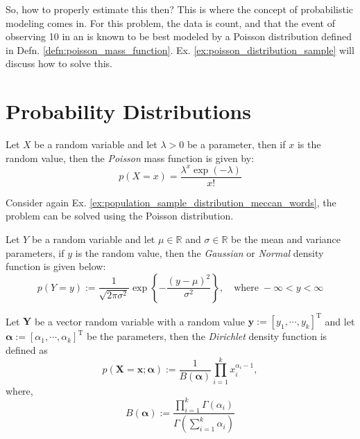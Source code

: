 \begin{exmp}
So, how to properly estimate this then? This is where the concept of probabilistic modeling comes in. For this problem, the data is count, and that the event of observing 10   in an  is known to be best modeled by a Poisson distribution defined in Defn. \ref{defn:poisson_mass_function}. Ex. \ref{ex:poisson_distribution_sample} will discuss how to solve this. 
\end{exmp}
\section{Probability Distributions}
\begin{defn}\label{defn:poisson_mass_function}
Let $X$ be a random variable and let $\lambda>0$ be a parameter, then if $x$ is the random value, then the \textit{Poisson} mass function is given by:
\begin{equation}
     p(X=x)=\frac{\lambda^x\exp(-\lambda)}{x!}
\end{equation}
\end{defn}
\begin{exmp}\label{ex:poisson_distribution_sample}
Consider again Ex. \ref{ex:population_sample_distribution_meccan_words}, the problem can be solved using the Poisson distribution.
\end{exmp}
\begin{defn}
Let $Y$ be a random variable and let $\mu\in\mathbb{R}$ and $\sigma\in\mathbb{R}$ be the mean and variance parameters, if $y$ is the random value, then the \textit{Gaussian} or \textit{Normal} density function is given below:
\begin{equation}
     p(Y=y):=\frac{1}{\sqrt{2\pi\sigma^2}}\exp\left\{-\frac{(y-\mu)^2}{\sigma^2}\right\},\quad\text{where}\;-\infty<y<\infty
\end{equation}
\end{defn}
\begin{defn}
Let $\mathbf{Y}$ be a vector random variable with a random value $\mathbf{y}:=[y_1,\cdots,y_k]^{\text{T}}$ and let $\boldsymbol{\alpha}:=[\alpha_1,\cdots,\alpha_k]^{\text{T}}$ be the parameters, then the \textit{Dirichlet} density function is defined as
\begin{equation}
     p(\mathbf{X}=\mathbf{x};\boldsymbol{\alpha}):=\frac{1}{B(\boldsymbol{\alpha})}\prod_{i=1}^kx_i^{\alpha_i-1},
\end{equation}
where,
\begin{equation}
    B(\boldsymbol{\alpha}):=\frac{\displaystyle\prod_{i=1}^k\Gamma(\alpha_i)}{\Gamma\left(\sum_{i=1}^k\alpha_i\right)}
\end{equation}

\end{defn}
